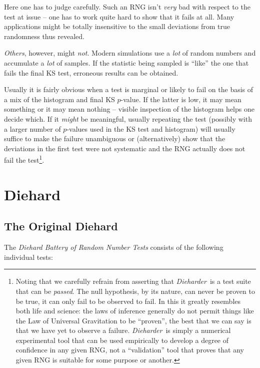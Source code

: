 \documentclass[12pt]{book}
\newcommand{\die}{\emph{Dieharder}\ }
\begin{document}
Here one has to judge carefully.  Such an RNG isn't {\em very} bad with
respect to the test at issue -- one has to work quite hard to show that
it fails at all.  Many applications might be totally insensitive to the
small deviations from true randomness thus revealed.

{\em Others}, however, might {\em not}.  Modern simulations use a {\em
lot} of random numbers and accumulate a {\em lot} of samples.  If the
statistic being sampled is ``like'' the one that fails the final KS
test, erroneous results can be obtained.

Usually it is fairly obvious when a test is marginal or likely to fail
on the basis of a mix of the histogram and final KS $p$-value.  If the
latter is low, it may mean something or it may mean nothing -- visible
inspection of the histogram helps one decide which.  If it {\em might}
be meaningful, usually repeating the test (possibly with a larger number
of $p$-values used in the KS test and histogram) will usually suffice to
make the failure unambiguous or (alternatively) show that the deviations
in the first test were not systematic and the RNG actually does not fail
the test\footnote{Noting that we carefully refrain from asserting that
\die is a test suite that can be {\em passed}.  The null hypothesis, by
its nature, can never be proven to be true, it can only fail to be
observed to fail.  In this it greatly resembles both life and science:
the laws of inference generally do not permit things like the Law of
Universal Gravitation to be ``proven'', the best that we can say is that
we have yet to observe a failure.  \die is simply a numerical
experimental tool that can be used empirically to develop a degree of
confidence in any given RNG, not a ``validation'' tool that proves that
any given RNG is suitable for some purpose or another.}.

\chapter{Diehard}

\section{The Original Diehard}

The {\em Diehard Battery of Random Number Tests} consists of the
following individual tests:
\end{document}
